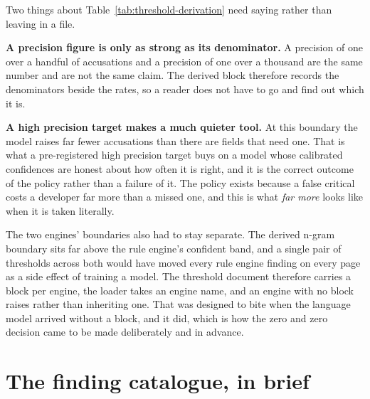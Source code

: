 \begin{table}[htbp]
  \centering
  \caption{The n-gram engine's derived boundary and what it bought on the
  development split. The precision target was registered before the model
  existed and the derivation script was run unmodified.}
  \label{tab:threshold-derivation}
  
\end{table}

Two things about Table~\ref{tab:threshold-derivation} need saying rather than
leaving in a file.

\textbf{A precision figure is only as strong as its denominator.} A precision of
one over a handful of accusations and a precision of one over a thousand are the
same number and are not the same claim. The derived block therefore records the
denominators beside the rates, so a reader does not have to go and find out which
it is.

\textbf{A high precision target makes a much quieter tool.} At this boundary the
model raises far fewer accusations than there are fields that need one. That is
what a pre-registered high precision target buys on a model whose calibrated
confidences are honest about how often it is right, and it is the correct outcome
of the policy rather than a failure of it. The policy exists because a false
critical costs a developer far more than a missed one, and this is what
\emph{far more} looks like when it is taken literally.

The two engines' boundaries also had to stay separate. The derived n-gram
boundary sits far above the rule engine's confident band, and a single pair of
thresholds across both would have moved every rule engine finding on every page
as a side effect of training a model. The threshold document therefore carries a
block per engine, the loader takes an engine name, and an engine with no block
raises rather than inheriting one. That was designed to bite when the language
model arrived without a block, and it did, which is how the zero and zero
decision came to be made deliberately and in advance.

\section{The finding catalogue, in brief}

